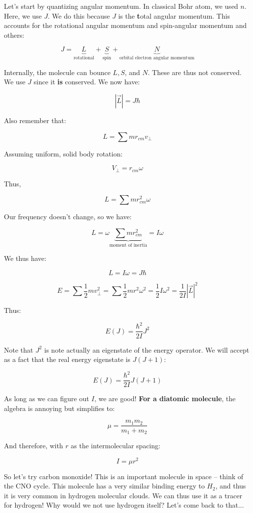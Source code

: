 \documentclass{article}
\newcommand{\be}{\begin{equation}}
\newcommand{\ee}{\end{equation}}
\begin{document}
Let's start by quantizing angular momentum. In classical Bohr atom, we used $n$. Here, we use $J$. We do this because $J$ is the {\textbf total angular momentum}. This accounts for the rotational angular momentum and spin-angular momentum and others:

\be
J = \underbrace{L}_{\text{rotational}} + \underbrace{S}_{\text{spin}} + \underbrace{N}_{\text{orbital electron angular momentum}}
\ee

Internally, the molecule can bounce $L, S$, and $N$. These are thus not conserved. We use $J$ since it \textbf{is} conserved. We now have:

\be
|\vec{L}| = J\hbar
\ee

Also remember that:

\be
L = \sum m r_{cm} v_\perp
\ee

Assuming uniform, solid body rotation:

\be
V_\perp = r_{cm} \omega
\ee

Thus, 

\be
L = \sum m r_{cm}^2 \omega 
\ee

Our frequency doesn't change, so we have:

\be
L =  \omega \underbrace{\sum m r_{cm}^2}_\text{moment of inertia} = I \omega
\ee

We thus have:

\be
L = I \omega = J \hbar
\ee

\be
E = \sum \frac12 m v_\perp^2 = \sum \frac12 mr^2 \omega^2 = \frac12 I \omega^2 = \frac{1}{2I} |\vec{L}|^2
\ee

Thus:

\be
E(J) = \frac{\hbar^2}{2I}J^2
\ee

Note that $J^2$ is note actually an eigenstate of the energy operator. We will accept as a fact that the real energy eigenstate is $J(J+1)$:


\be
\boxed{{E(J) = \frac{\hbar^2}{2I}J\left(J+1\right)}}
\ee

As long as we can figure out $I$, we are good! \textbf{For a diatomic molecule}, the algebra is annoying but simplifies to:

\be
\mu = \frac{m_1 m_2}{m_1 + m_2}
\ee

And therefore, with $r$ as the intermolecular spacing:

\be
I = \mu r^2 
\ee

So let's try carbon monoxide! This is an important molecule in space -- think of the CNO cycle. This molecule has a very similar binding energy to $H_2$, and thus it is very common in hydrogen molecular clouds. We can thus use it as a tracer for hydrogen! Why would we not use hydrogen itself? Let's come back to that...
\end{document}
